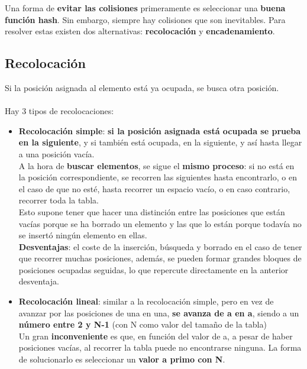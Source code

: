 \documentclass{article}
\begin{document}
Una forma de \textbf{evitar las colisiones} primeramente es seleccionar una \textbf{buena función hash}. Sin embargo, siempre hay colisiones que son inevitables. Para resolver estas existen dos alternativas: \textbf{recolocación} y \textbf{encadenamiento}. \\

\subsection{Recolocación}
Si la posición asignada al elemento está ya ocupada, se busca otra posición. \\\\ 
Hay 3 tipos de recolocaciones: 

\begin{itemize}
    \item \textbf{Recolocación simple}: \textbf{si la posición asignada está ocupada se prueba en la siguiente}, y si también está ocupada, en la siguiente, y así hasta llegar a una posición vacía. \\

    A la hora de \textbf{buscar elementos}, se sigue el \textbf{mismo proceso}: si no está en la posición correspondiente, se recorren las siguientes hasta encontrarlo, o en el caso de que no esté, hasta recorrer un espacio vacío, o en caso contrario, recorrer toda la tabla. \\

    Esto supone tener que hacer una distinción entre las posiciones que están vacías porque se ha borrado un elemento y las que lo están porque todavía no se insertó ningún elemento en ellas. \\

    \textbf{Desventajas}: el coste de la inserción, búsqueda y borrado en el caso de tener que recorrer muchas posiciones, además, se pueden formar grandes bloques de posiciones ocupadas seguidas, lo que repercute directamente en la anterior desventaja.

    \newpage

    \item \textbf{Recolocación lineal}: similar a la recolocación simple, pero en vez de avanzar por las posiciones de una en una, \textbf{se avanza de a en a}, siendo a un \textbf{número entre 2 y N-1} (con N como valor del tamaño de la tabla) \\
    
    Un gran \textbf{inconveniente} es que, en función del valor de a, a pesar de haber posiciones vacías, al recorrer la tabla puede no encontrarse ninguna. La forma de solucionarlo es seleccionar un \textbf{valor a primo con N}.\\


\end{itemize}
\end{document}
